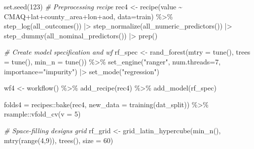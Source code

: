 \documentclass[
]{article}
\newenvironment{Shaded}{\begin{snugshade}}{\end{snugshade}}
\newcommand{\AttributeTok}[1]{\textcolor[rgb]{0.77,0.63,0.00}{#1}}
\newcommand{\CommentTok}[1]{\textcolor[rgb]{0.56,0.35,0.01}{\textit{#1}}}
\newcommand{\DecValTok}[1]{\textcolor[rgb]{0.00,0.00,0.81}{#1}}
\newcommand{\FunctionTok}[1]{\textcolor[rgb]{0.00,0.00,0.00}{#1}}
\newcommand{\NormalTok}[1]{#1}
\newcommand{\OtherTok}[1]{\textcolor[rgb]{0.56,0.35,0.01}{#1}}
\newcommand{\SpecialCharTok}[1]{\textcolor[rgb]{0.00,0.00,0.00}{#1}}
\newcommand{\StringTok}[1]{\textcolor[rgb]{0.31,0.60,0.02}{#1}}
\begin{document}
\begin{Shaded}
\begin{Highlighting}[]
\FunctionTok{set.seed}\NormalTok{(}\DecValTok{123}\NormalTok{)}
\CommentTok{\# Preprocessing recipe}
\NormalTok{rec4 }\OtherTok{\textless{}{-}} \FunctionTok{recipe}\NormalTok{(value }\SpecialCharTok{\textasciitilde{}}\NormalTok{ CMAQ}\SpecialCharTok{+}\NormalTok{lat}\SpecialCharTok{+}\NormalTok{county\_area}\SpecialCharTok{+}\NormalTok{lon}\SpecialCharTok{+}\NormalTok{aod, }\AttributeTok{data=}\NormalTok{train) }\SpecialCharTok{\%\textgreater{}\%}
  \FunctionTok{step\_log}\NormalTok{(}\FunctionTok{all\_outcomes}\NormalTok{()) }\SpecialCharTok{|\textgreater{}} 
  \FunctionTok{step\_normalize}\NormalTok{(}\FunctionTok{all\_numeric\_predictors}\NormalTok{()) }\SpecialCharTok{|\textgreater{}} 
  \FunctionTok{step\_dummy}\NormalTok{(}\FunctionTok{all\_nominal\_predictors}\NormalTok{()) }\SpecialCharTok{|\textgreater{}} \FunctionTok{prep}\NormalTok{()}

\CommentTok{\#  Create model specification and wf}
\NormalTok{rf\_spec }\OtherTok{\textless{}{-}} \FunctionTok{rand\_forest}\NormalTok{(}\AttributeTok{mtry =} \FunctionTok{tune}\NormalTok{(), }\AttributeTok{trees =} \FunctionTok{tune}\NormalTok{(), }\AttributeTok{min\_n =} \FunctionTok{tune}\NormalTok{()) }\SpecialCharTok{\%\textgreater{}\%}
  \FunctionTok{set\_engine}\NormalTok{(}\StringTok{"ranger"}\NormalTok{, }\AttributeTok{num.threads=}\DecValTok{7}\NormalTok{, }\AttributeTok{importance=}\StringTok{"impurity"}\NormalTok{) }\SpecialCharTok{|\textgreater{}} 
  \FunctionTok{set\_mode}\NormalTok{(}\StringTok{"regression"}\NormalTok{)}

\NormalTok{wf4 }\OtherTok{\textless{}{-}} \FunctionTok{workflow}\NormalTok{() }\SpecialCharTok{\%\textgreater{}\%}
  \FunctionTok{add\_recipe}\NormalTok{(rec4) }\SpecialCharTok{\%\textgreater{}\%}
  \FunctionTok{add\_model}\NormalTok{(rf\_spec)}

\NormalTok{folds4 }\OtherTok{=}\NormalTok{ recipes}\SpecialCharTok{::}\FunctionTok{bake}\NormalTok{(rec4, }\AttributeTok{new\_data =} \FunctionTok{training}\NormalTok{(dat\_split)) }\SpecialCharTok{\%\textgreater{}\%}  
\NormalTok{  rsample}\SpecialCharTok{::}\FunctionTok{vfold\_cv}\NormalTok{(}\AttributeTok{v =} \DecValTok{5}\NormalTok{)}

\CommentTok{\# Space{-}filling designs grid}
\NormalTok{rf\_grid }\OtherTok{\textless{}{-}} \FunctionTok{grid\_latin\_hypercube}\NormalTok{(}\FunctionTok{min\_n}\NormalTok{(), }\FunctionTok{mtry}\NormalTok{(}\FunctionTok{range}\NormalTok{(}\DecValTok{4}\NormalTok{,}\DecValTok{9}\NormalTok{)), }\FunctionTok{trees}\NormalTok{(), }\AttributeTok{size =} \DecValTok{60}\NormalTok{)}



\end{Highlighting}
\end{Shaded}
\end{document}
